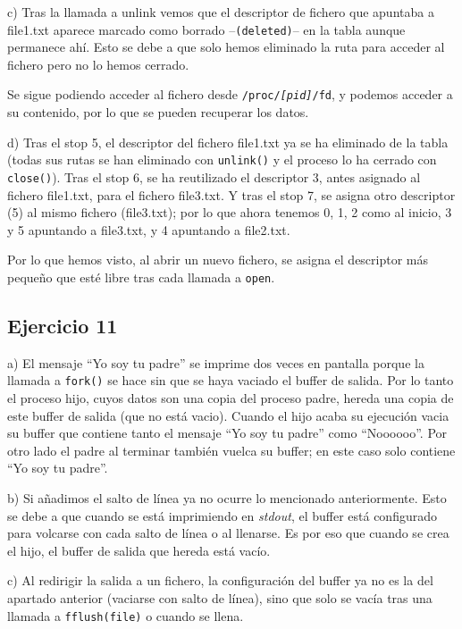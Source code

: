 \documentclass{article}
\begin{document}
c) Tras la llamada a unlink vemos que el descriptor de fichero que apuntaba a file1.txt aparece marcado como borrado --\texttt{(deleted)}-- en la tabla aunque permanece ahí. Esto se debe a que solo hemos eliminado la ruta para acceder al fichero pero no lo hemos cerrado.

Se sigue podiendo acceder al fichero desde \texttt{/proc/\textit{[pid]}/fd}, y podemos acceder a su contenido, por lo que se pueden recuperar los datos.

d) Tras el stop 5, el descriptor del fichero file1.txt ya se ha eliminado de la tabla (todas sus rutas se han eliminado con \texttt{unlink()} y el proceso lo ha cerrado con \texttt{close()}). Tras el stop 6, se ha reutilizado el descriptor 3, antes asignado al fichero file1.txt, para el fichero file3.txt. Y tras el stop 7, se asigna otro descriptor (5) al mismo fichero (file3.txt); por lo que ahora tenemos 0, 1, 2 como al inicio, 3 y 5 apuntando a file3.txt, y 4 apuntando a file2.txt.

Por lo que hemos visto, al abrir un nuevo fichero, se asigna el descriptor más pequeño que esté libre tras cada llamada a \texttt{open}.

\subsection*{Ejercicio 11}

a) El mensaje ``Yo soy tu padre'' se imprime dos veces en pantalla porque la llamada a \texttt{fork()} se hace sin que se haya vaciado el buffer de salida. Por lo tanto el proceso hijo, cuyos datos son una copia del proceso padre, hereda una copia de este buffer de salida (que no está vacio). Cuando el hijo acaba su ejecución vacia su buffer que contiene tanto el mensaje ``Yo soy tu padre'' como ``Noooooo''. Por otro lado el padre al terminar también vuelca su buffer; en este caso solo contiene ``Yo soy tu padre''.

b) Si añadimos el salto de línea ya no ocurre lo mencionado anteriormente. Esto se debe a que cuando se está imprimiendo en \textit{stdout}, el buffer está configurado para volcarse con cada salto de línea o al llenarse. Es por eso que cuando se crea el hijo, el buffer de salida que hereda está vacío.

c) Al redirigir la salida a un fichero, la configuración del buffer ya no es la del apartado anterior (vaciarse con salto de línea), sino que solo se vacía tras una llamada a \texttt{fflush(file)} o cuando se llena.
\end{document}
